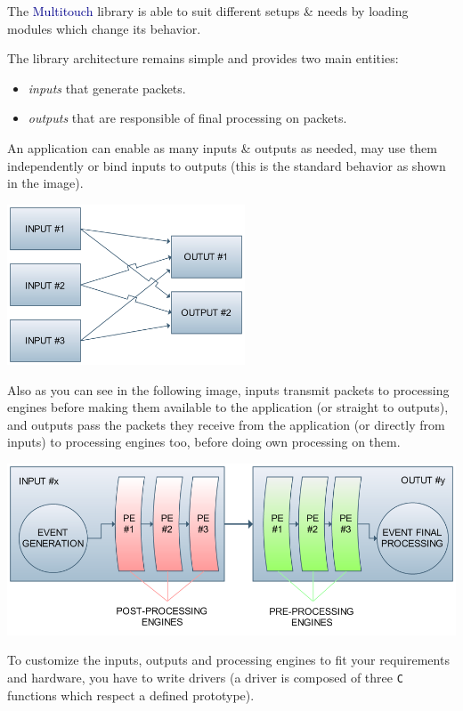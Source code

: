 The \textcolor{darkblue}{Multitouch} library is able to suit different setups 
\& needs by loading modules which change its behavior.

The library architecture remains simple and provides two main entities:
\begin{itemize}
\item \textit{inputs} that generate packets.
\item \textit{outputs} that are responsible of final processing on packets. 
\end{itemize}
An application can enable as many inputs \& outputs as needed, may use
them independently or bind inputs to outputs (this is the standard
behavior as shown in the image).
\begin{center}
\includegraphics[keepaspectratio=true, width=200pt]{images/arch.png}
\end{center}

Also as you can see in the following image, inputs transmit 
packets to processing engines before making them available to the application
(or straight to outputs), and outputs pass the packets they receive from the 
application (or directly from inputs) to processing engines too, before doing 
own processing on them.
\begin{center}
\includegraphics[keepaspectratio=true, width=\textwidth]{images/arch_pe.png}
\end{center}

To customize the inputs, outputs and processing engines to fit your
requirements and hardware, you have to write drivers (a driver is 
composed of three \texttt{C} functions which respect a defined prototype).

